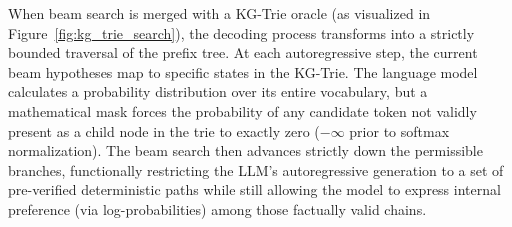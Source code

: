 When beam search is merged with a KG-Trie oracle (as visualized in Figure~\ref{fig:kg_trie_search}), the decoding process transforms into a strictly bounded traversal of the prefix tree. At each autoregressive step, the current beam hypotheses map to specific states in the KG-Trie. The language model calculates a probability distribution over its entire vocabulary, but a mathematical mask forces the probability of any candidate token not validly present as a child node in the trie to exactly zero ($-\infty$ prior to softmax normalization). The beam search then advances strictly down the permissible branches, functionally restricting the LLM's autoregressive generation to a set of pre-verified deterministic paths while still allowing the model to express internal preference (via log-probabilities) among those factually valid chains.

